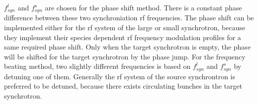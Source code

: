 %
$f_{\mathit{syn}}^{l}$ and $f_{\mathit{syn}}^{s}$ are chosen for the phase shift method. There is a constant phase difference between these two synchroniation rf frequencies. The phase shift can be implemented either for the rf system of the large or small synchrotron, because they implement their species dependent rf frequency modulation profiles for a same required phase shift. Only when the target synchrotron is empty, the phase will be shifted for the target synchrotron by the phase jump. For the frequency beating method, two slightly different frequencies is based on $f_{\mathit{syn}}^{l}$ and $f_{\mathit{syn}}^{s}$ by detuning one of them. Generally the rf system of the source synchrontron is preferred to be detuned, because there exists circulating bunches in the target synchrotron. 

